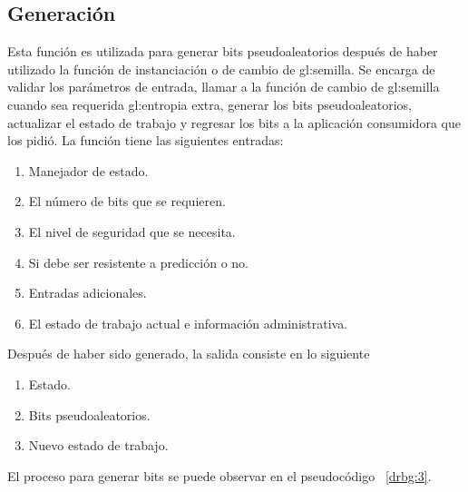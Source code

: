 \subsection{Generación}
Esta función es utilizada para generar bits pseudoaleatorios después de haber
utilizado la función de instanciación o de cambio de \gls{gl:semilla}. Se
encarga de validar los parámetros de entrada, llamar a la función de cambio de
\gls{gl:semilla} cuando sea requerida \gls{gl:entropia} extra, generar los bits
pseudoaleatorios, actualizar el estado de trabajo y regresar los bits a la
aplicación consumidora que los pidió. La función tiene las siguientes entradas:

\begin{enumerate}
  \item Manejador de estado.
  \item El número de bits que se requieren.
  \item El nivel de seguridad que se necesita.
  \item Si debe ser resistente a predicción o no.
  \item Entradas adicionales.
  \item El estado de trabajo actual e información administrativa.
\end{enumerate}

Después de haber sido generado, la salida consiste en lo siguiente

\begin{enumerate}
  \item Estado.
  \item Bits pseudoaleatorios.
  \item Nuevo estado de trabajo.
\end{enumerate}

El proceso para generar bits se puede observar en el pseudocódigo
~\ref{drbg:3}.

